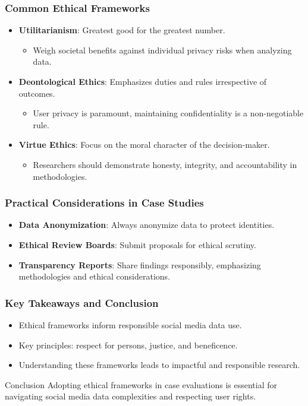 \documentclass{beamer}
\begin{document}
\begin{frame}[fragile]
    \frametitle{Common Ethical Frameworks}
    \begin{itemize}
        \item \textbf{Utilitarianism}: Greatest good for the greatest number. 
            \begin{itemize}
                \item Weigh societal benefits against individual privacy risks when analyzing data.
            \end{itemize}

        \item \textbf{Deontological Ethics}: Emphasizes duties and rules irrespective of outcomes.
            \begin{itemize}
                \item User privacy is paramount, maintaining confidentiality is a non-negotiable rule.
            \end{itemize}

        \item \textbf{Virtue Ethics}: Focus on the moral character of the decision-maker.
            \begin{itemize}
                \item Researchers should demonstrate honesty, integrity, and accountability in methodologies.
            \end{itemize}
    \end{itemize}
\end{frame}

\begin{frame}[fragile]
    \frametitle{Practical Considerations in Case Studies}
    \begin{itemize}
        \item \textbf{Data Anonymization}: Always anonymize data to protect identities.
        \item \textbf{Ethical Review Boards}: Submit proposals for ethical scrutiny.
        \item \textbf{Transparency Reports}: Share findings responsibly, emphasizing methodologies and ethical considerations.
    \end{itemize}
\end{frame}

\begin{frame}[fragile]
    \frametitle{Key Takeaways and Conclusion}
    \begin{itemize}
        \item Ethical frameworks inform responsible social media data use.
        \item Key principles: respect for persons, justice, and beneficence.
        \item Understanding these frameworks leads to impactful and responsible research.
    \end{itemize}
    
    \begin{block}{Conclusion}
        Adopting ethical frameworks in case evaluations is essential for navigating social media data complexities and respecting user rights.
    \end{block}
\end{frame}
\end{document}
